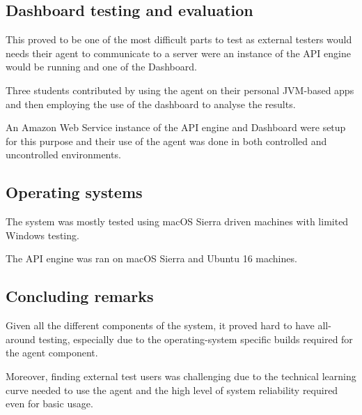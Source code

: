 \subsection{Dashboard testing and evaluation}
This proved to be one of the most difficult parts to test as external testers would needs their agent to communicate to a server were an instance of the API engine would be running and one of the Dashboard.

Three students contributed by using the agent on their personal JVM-based apps and then employing the use of the dashboard to analyse the results.

An Amazon Web Service instance of the API engine and Dashboard were setup for this purpose and their use of the agent was done in both controlled  and uncontrolled environments.

\subsection{Operating systems}
The system was mostly tested using macOS Sierra driven machines with limited Windows testing.

The API engine was ran on macOS Sierra and Ubuntu 16 machines.

\subsection{Concluding remarks}
Given all the different components of the system, it proved hard to have all-around testing, especially due to the operating-system specific builds required for the agent component.

Moreover, finding external test users was challenging due to the technical learning curve needed to use the agent and the high level of system reliability required even for basic usage.


\newpage